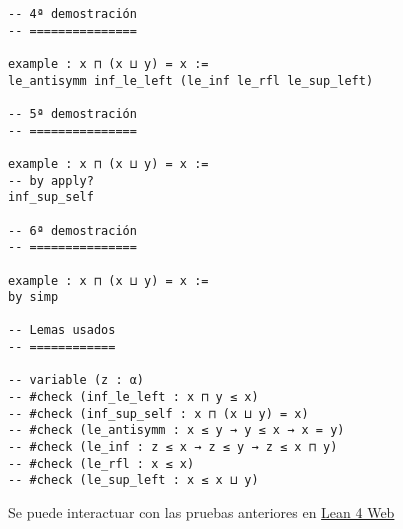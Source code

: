 \begin{verbatim}
-- 4ª demostración
-- ===============

example : x ⊓ (x ⊔ y) = x :=
le_antisymm inf_le_left (le_inf le_rfl le_sup_left)

-- 5ª demostración
-- ===============

example : x ⊓ (x ⊔ y) = x :=
-- by apply?
inf_sup_self

-- 6ª demostración
-- ===============

example : x ⊓ (x ⊔ y) = x :=
by simp

-- Lemas usados
-- ============

-- variable (z : α)
-- #check (inf_le_left : x ⊓ y ≤ x)
-- #check (inf_sup_self : x ⊓ (x ⊔ y) = x)
-- #check (le_antisymm : x ≤ y → y ≤ x → x = y)
-- #check (le_inf : z ≤ x → z ≤ y → z ≤ x ⊓ y)
-- #check (le_rfl : x ≤ x)
-- #check (le_sup_left : x ≤ x ⊔ y)
\end{verbatim}
Se puede interactuar con las pruebas anteriores en \href{https://lean.math.hhu.de/\#url=https://raw.githubusercontent.com/jaalonso/Calculemus2/main/src/Leyes\_de\_absorcion\_1.lean}{Lean 4 Web}

